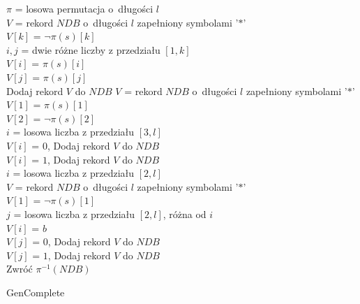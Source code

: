 \begin{algorithm}[!htb]
    \SetAlgoLined
    $\pi$ = losowa permutacja o~długości $l$\\
    {
        $V$ = rekord $NDB$ o~długości $l$ zapełniony symbolami '$*$'\\
        $V[k]$ = $\neg \pi(s)[k]$\\
        $i, j$ = dwie różne liczby z przedziału $[1, k]$\\
        $V[i]$ = $\pi(s)[i]$\\
        $V[j]$ = $\pi(s)[j]$\\
        Dodaj rekord $V$ do $NDB$
    }
    $V$ = rekord $NDB$ o~długości $l$ zapełniony symbolami '$*$'\\
    $V[1]$ = $\pi(s)[1]$\\
    $V[2]$ = $\neg \pi(s)[2]$\\
    $i$ = losowa liczba z przedziału $[3, l]$\\
    $V[i]$ = $0$, Dodaj rekord $V$ do $NDB$\\    
    $V[i]$ = $1$, Dodaj rekord $V$ do $NDB$\\

    
    $i$ = losowa liczba z przedziału $[2, l]$\\
    {
        $V$ = rekord $NDB$ o~długości $l$ zapełniony symbolami '$*$'\\    
        $V[1]$ = $\neg \pi(s)[1]$\\
        $j$ = losowa liczba z przedziału $[2, l]$, różna od $i$\\
        $V[i]$ = $b$\\
        $V[j]$ = $0$, Dodaj rekord $V$ do $NDB$\\
        $V[j]$ = $1$, Dodaj rekord $V$ do $NDB$\\
    }
    Zwróć $\pi^{-1}(NDB)$
    \caption{GenComplete}
    \label{alg:hybrid-gencomplete}
\end{algorithm}


